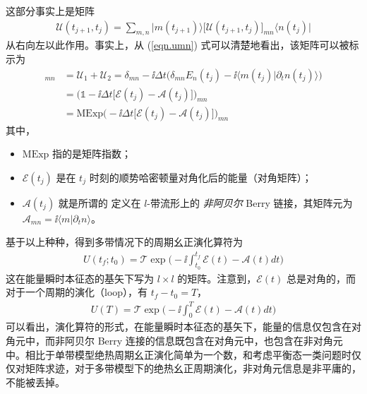 这部分事实上是矩阵
\begin{align}
\mathscr{U}(t_{j+1},t_j)=\sum_{m,n}\bigg|m(t_{j+1})\bigg\rangle \big[\mathscr{U}(t_{j+1},t_j)\big]_{mn} \bigg\langle n(t_j)\bigg|
\end{align}
从右向左以此作用。事实上，从 (\ref{eqn.umn}) 式可以清楚地看出，该矩阵可以被标示为
\begin{align}
[\mathscr{U}(t_{j+1},t_j)]_{mn}&=\mathscr{U}_1+\mathscr{U}_2=\delta_{mn}-\ii\Delta t\bigg(\delta_{mn}E_{n}(t_j)-\ii\langle m(t_j)|\partial_tn(t_j)\rangle\bigg)\\
&=\bigg(\mathbb{1}-\ii\Delta t\Big[\mathcal{E}(t_j)-\mathcal{A}(t_j)\Big]\bigg)_{mn}\\
&= \text{MExp}\bigg(-\ii\Delta t\Big[\mathcal{E}(t_j)-\mathcal{A}(t_j)\Big]\bigg)_{mn}
\end{align}
其中，
\begin{itemize}
\item $\text{MExp}$ 指的是矩阵指数；
\item $\mathcal{E}(t_j)$ 是在 $t_j$ 时刻的顺势哈密顿量对角化后的能量（对角矩阵）；
\item $\mathcal{A}(t_j)$ 就是所谓的 定义在 $l$-带流形上的 \textit{非阿贝尔} Berry 链接，其矩阵元为 $\mathcal{A}_{mn}=\ii\langle m|\partial_tn\rangle$。
\end{itemize}

基于以上种种，得到多带情况下的周期幺正演化算符为
\begin{align}
U(t_f;t_0)=\mathcal{T}\exp\bigg(-\ii\int_{t_0}^{t_f}\mathcal{E}(t)-\mathcal{A}(t)dt\bigg)
\end{align}
这在能量瞬时本征态的基矢下写为 $l\times l$ 的矩阵。注意到，$\mathcal{E}(t)$ 总是对角的，而对于一个周期的演化（loop），有 $t_f-t_0=T$，
\begin{align}
U(T)=\mathcal{T}\exp\bigg(-\ii\int_{0}^{T}\mathcal{E}(t)-\mathcal{A}(t)dt\bigg)
\end{align}
可以看出，演化算符的形式，在能量瞬时本征态的基矢下，能量的信息仅包含在对角元中，而非阿贝尔 Berry 连接的信息既包含在对角元中，也包含在非对角元中。相比于单带模型绝热周期幺正演化简单为一个数，和考虑平衡态一类问题时仅仅对矩阵求迹，对于多带模型下的绝热幺正周期演化，非对角元信息是非平庸的，不能被丢掉。






